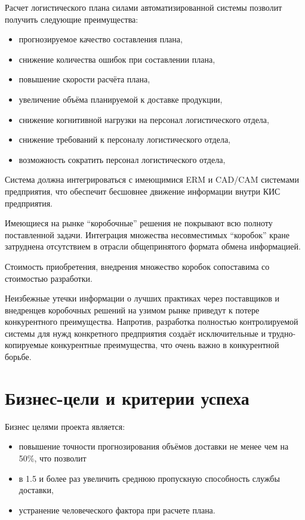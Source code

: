 Расчет логистического плана силами автоматизированной системы позволит получить следующие преимущества:
\begin{itemize}
    \item прогнозируемое качество составления плана,
    \item снижение количества ошибок при составлении плана,
    \item повышение скорости расчёта плана,
    \item увеличение объёма планируемой к доставке продукции,
    \item снижение когнитивной нагрузки на персонал логистического отдела,
    \item снижение требований к персоналу логистического отдела,
    \item возможность сократить персонал логистического отдела,
\end{itemize}

Система должна интегрироваться с имеющимися ERM и CAD/CAM системами предприятия, что обеспечит бесшовнее движение информации внутри КИС предприятия.

Имеющиеся на рынке ``коробочные'' решения не покрывают всю полноту поставленной задачи.
Интеграция множества несовместимых ``коробок'' кране затруднена отсутствием в отрасли общепринятого формата обмена информацией.

Стоимость приобретения, внедрения множество коробок сопоставима со стоимостью разработки.

Неизбежные утечки информации о лучших практиках через поставщиков и внедренцев коробочных решений на узимом рынке приведут к потере конкурентного преимущества.
Напротив, разработка полностью контролируемой системы для нужд конкретного предприятия создаёт исключительные и трудно-копируемые конкурентные преимущества, что очень важно в конкурентной борьбе.


\section{Бизнес-цели и критерии успеха}
\label{sec:goals}

Бизнес целями проекта является:
\begin{itemize}
    \item повышение точности прогнозирования объёмов доставки не менее чем на 50\%, что позволит
    \item в 1.5 и более раз увеличить среднюю пропускную способность службы доставки,
    \item устранение человеческого фактора при расчете плана.
\end{itemize}



